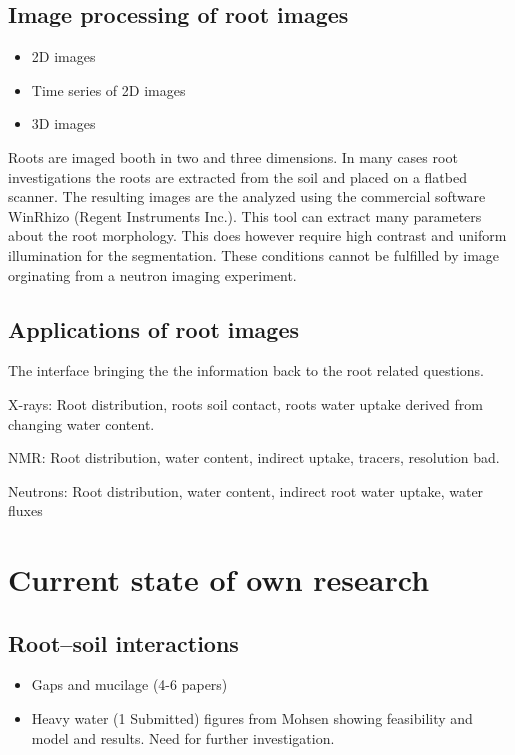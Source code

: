 \documentclass[a4paper,11pt]{scrreprt}
\begin{document}
\subsection{Image processing of root images}
\begin{itemize}
\item 2D images
\item Time series of 2D images
\item 3D images
\end{itemize}

Roots are imaged booth in two and three dimensions. In many cases root investigations the roots 
are extracted from the soil and placed on a flatbed scanner. The resulting images are the analyzed
using the commercial software WinRhizo (Regent Instruments Inc.). This tool can extract many parameters 
about the root morphology. This does however require high contrast and uniform illumination 
for the segmentation. These conditions cannot be fulfilled by image orginating from a neutron 
imaging experiment. 


\subsection{Applications of root images}
The interface bringing the the information back to the root related questions.

X-rays: Root distribution, roots soil contact, roots water uptake derived from changing water content.

NMR: Root distribution, water content, indirect uptake, tracers, resolution bad.

Neutrons: Root distribution, water content, indirect root water uptake, water fluxes

\cite{matsushima2009_plant}

\section{Current state of own research}

\subsection{Root--soil interactions}
\begin{itemize}
\item Gaps and mucilage (4-6 papers)
\item Heavy water (1 Submitted) figures from Mohsen showing feasibility and model and results. Need for further investigation.
\end{itemize}
\end{document}
